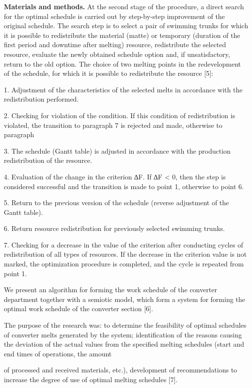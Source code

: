 {\bfseries Materials and methods.} At the second stage of the procedure, a
direct search for the optimal schedule is carried out by step-by-step
improvement of the original schedule. The search step is to select a
pair of swimming trunks for which it is possible to redistribute the
material (matte) or temporary (duration of the first period and downtime
after melting) resource, redistribute the selected resource, evaluate
the newly obtained schedule option and, if unsatisfactory, return to the
old option. The choice of two melting points in the redevelopment of the
schedule, for which it is possible to redistribute the resource {[}5{]}:

1. Adjustment of the characteristics of the selected melts in accordance
with the redistribution performed.

2. Checking for violation of the condition. If this condition of
redistribution is violated, the transition to paragraph 7 is rejected
and made, otherwise to paragraph

3. The schedule (Gantt table) is adjusted in accordance with the
production redistribution of the resource.

4. Evaluation of the change in the criterion ∆F. If ∆F \textless{} 0,
then the step is considered successful and the transition is made to
point 1, otherwise to point 6.

5. Return to the previous version of the schedule (reverse adjustment of
the Gantt table).

6. Return resource redistribution for previously selected swimming
trunks.

7. Checking for a decrease in the value of the criterion after
conducting cycles of redistribution of all types of resources. If the
decrease in the criterion value is not marked, the optimization
procedure is completed, and the cycle is repeated from point 1.

We present an algorithm for forming the work schedule of the converter
department together with a semiotic model, which form a system for
forming the optimal work schedule of the converter section {[}6{]}.

The purpose of the research was: to determine the feasibility of optimal
schedules of converter melts generated by the system; identification of
the reasons causing the deviation of the actual values from the
specified melting schedules (start and end times of operations, the
amount

of processed and received materials, etc.), development of
recommendations to increase the degree of use of optimal melting
schedules {[}7{]}.

